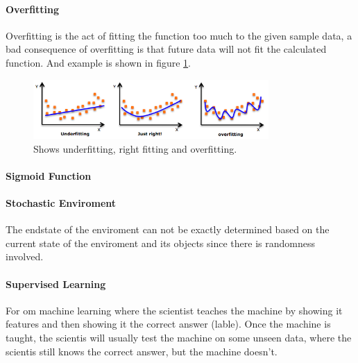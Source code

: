 \paragraph{Overfitting}
Overfitting is the act of fitting the function too much to the given sample data, a bad consequence of overfitting is that future data will not fit the calculated function. And example is shown in figure \ref{fig:svm-overfitting}.

\begin{figure}
\centering
\includegraphics[width=0.8\textwidth]{images/svm-overfitting.png}
\caption{\label{fig:svm-overfitting} Shows underfitting, right fitting and overfitting.}
\end{figure}

\paragraph{Sigmoid Function}

\paragraph{Stochastic Enviroment}
The endstate of the enviroment can not be exactly determined based on the current state of the enviroment and its objects since there is randomness involved.

\paragraph{Supervised Learning} 
For om machine learning where the scientist teaches the machine by showing it features and then showing it the correct answer (lable). Once the machine is taught, the scientis will usually test the machine on some unseen data, where the scientis still knows the correct answer, but the machine doesn't.

